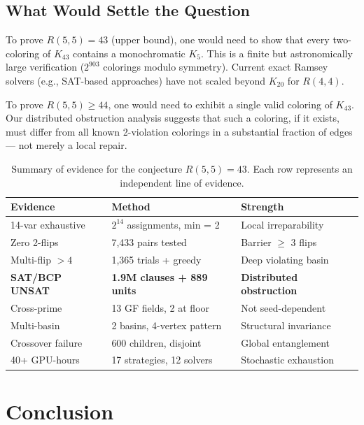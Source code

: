 \documentclass[11pt,a4paper]{article}
\theoremstyle{plain}
\theoremstyle{remark}
\begin{document}
\subsection{What Would Settle the Question}

To prove $R(5,5) = 43$ (upper bound), one would need to show that
every two-coloring of $K_{43}$ contains a monochromatic $K_5$.
This is a finite but astronomically large verification
($2^{903}$ colorings modulo symmetry). Current exact Ramsey solvers
(e.g., SAT-based approaches) have not scaled beyond $K_{20}$ for
$R(4,4)$.

To prove $R(5,5) \geq 44$, one would need to exhibit a single valid
coloring of $K_{43}$. Our distributed obstruction analysis suggests
that such a coloring, if it exists, must differ from all known
2-violation colorings in a substantial fraction of edges ---
not merely a local repair.

\begin{table}[H]
\centering
\caption{Summary of evidence for the conjecture $R(5,5) = 43$.
  Each row represents an independent line of evidence.}
\label{tab:evidence}
\small
\begin{tabular}{@{}lll@{}}
\toprule
\textbf{Evidence} & \textbf{Method} & \textbf{Strength} \\
\midrule
14-var exhaustive & $2^{14}$ assignments, min = 2 & Local irreparability \\
Zero 2-flips & 7{,}433 pairs tested & Barrier $\geq$ 3 flips \\
Multi-flip $> 4$ & 1{,}365 trials + greedy & Deep violating basin \\
\textbf{SAT/BCP UNSAT} & \textbf{1.9M clauses + 889 units} & \textbf{Distributed obstruction} \\
Cross-prime & 13 GF fields, 2 at floor & Not seed-dependent \\
Multi-basin & 2 basins, 4-vertex pattern & Structural invariance \\
Crossover failure & 600 children, disjoint & Global entanglement \\
40+ GPU-hours & 17 strategies, 12 solvers & Stochastic exhaustion \\
\bottomrule
\end{tabular}
\end{table}

\section{Conclusion}
\end{document}
